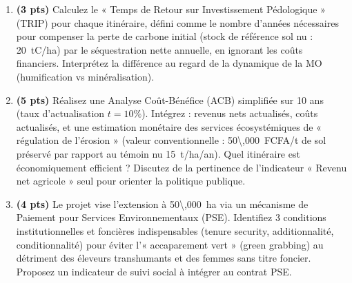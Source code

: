 \documentclass[11pt]{article}
\begin{document}
\begin{exercice}
\begin{enumerate}
\item \textbf{(3 pts)} Calculez le « Temps de Retour sur Investissement Pédologique » (TRIP) pour chaque itinéraire, défini comme le nombre d'années nécessaires pour compenser la perte de carbone initial (stock de référence sol nu : \SI{20}{tC/ha}) par le séquestration nette annuelle, en ignorant les coûts financiers. Interprétez la différence au regard de la dynamique de la MO (humification vs minéralisation).
\item \textbf{(5 pts)} Réalisez une Analyse Coût-Bénéfice (ACB) simplifiée sur 10 ans (taux d'actualisation $t = 10\%$). Intégrez : revenus nets actualisés, coûts actualisés, et une estimation monétaire des services écosystémiques de « régulation de l'érosion » (valeur conventionnelle : \SI{50\,000}{FCFA/t} de sol préservé par rapport au témoin nu \SI{15}{t/ha/an}). Quel itinéraire est économiquement efficient ? Discutez de la pertinence de l'indicateur « Revenu net agricole » seul pour orienter la politique publique.
\item \textbf{(4 pts)} Le projet vise l'extension à \SI{50\,000}{ha} via un mécanisme de Paiement pour Services Environnementaux (PSE). Identifiez 3 conditions institutionnelles et foncières indispensables (tenure security, additionnalité, conditionnalité) pour éviter l'« accaparement vert » (green grabbing) au détriment des éleveurs transhumants et des femmes sans titre foncier. Proposez un indicateur de suivi social à intégrer au contrat PSE.
\end{enumerate}
\end{exercice}
\end{document}

